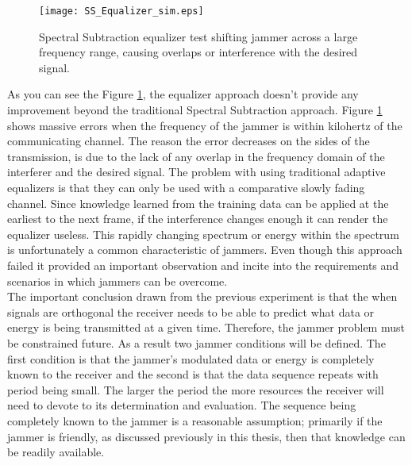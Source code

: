 \begin{figure}[!ht]
\centering
\texttt{[image: SS\_Equalizer\_sim.eps]}
\caption{Spectral Subtraction equalizer test shifting jammer across a large frequency range, causing overlaps or interference with the desired signal.}
\label{SS_equalizer}
\end{figure} 

As you can see the Figure \ref{SS_equalizer}, the equalizer approach doesn't provide any improvement beyond the traditional Spectral Subtraction approach.  Figure \ref{SS_equalizer} shows massive errors when the frequency of the jammer is within kilohertz of the communicating channel.  The reason the error decreases on the sides of the transmission, is due to the lack of any overlap in the frequency domain of the interferer and the desired signal.  The problem with using traditional adaptive equalizers is that they can only be used with a comparative slowly fading channel.  Since knowledge learned from the training data can be applied at the earliest to the next frame, if the interference changes enough it can render the equalizer useless.  This rapidly changing spectrum or energy within the spectrum is unfortunately a common characteristic of jammers.  Even though this approach failed it provided an important observation and incite into the requirements and scenarios in which jammers can be overcome.\\ %



The important conclusion drawn from the previous experiment is that the when signals are orthogonal the receiver needs to be able to predict what data or energy is being transmitted at a given time.  Therefore, the jammer problem must be constrained future.  As a result two jammer conditions will be defined.  The first condition is that the jammer's modulated data or energy is completely known to the receiver and the second is that the data sequence repeats with period being small.  The larger the period the more resources the receiver will need to devote to its determination and evaluation.  The sequence being completely known to the jammer is a reasonable assumption; primarily if the jammer is friendly, as discussed previously in this thesis, then that knowledge can be readily available.\\


